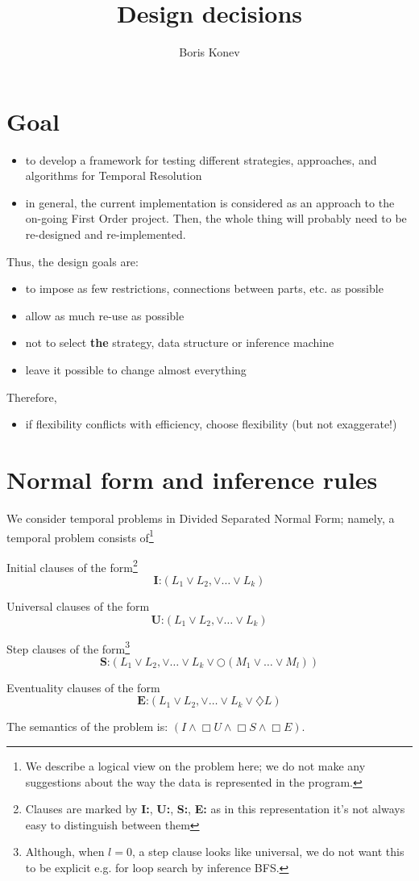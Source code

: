 \documentclass[a4paper]{article}
\newcommand*{\memph}{\textbf}
\newcommand*{\next}{\bigcirc}
\newcommand*{\always}{\Box}
\newcommand*{\sometime}{\diamondsuit}
\newcommand*{\Itag}{\textbf{I:}}
\newcommand*{\Utag}{\textbf{U:}}
\newcommand*{\Stag}{\textbf{S:}}
\newcommand*{\Etag}{\textbf{E:}}
\begin{document}
\title{Design decisions}
\author{Boris Konev}
\maketitle
\section{Goal}
\begin{itemize}
\item to develop a framework for testing different strategies, approaches,
and algorithms for Temporal Resolution
\item in general, the current implementation is considered as an approach
to the on-going First Order project. Then, the whole thing will probably 
need to be re-designed and re-implemented.
\end{itemize}
Thus, the design goals are:
\begin{itemize}
\item to impose as few restrictions, connections between parts, etc. as possible
\item allow as much re-use as possible
\item not to select \memph{the} strategy, data structure or inference machine
\item leave it possible to change almost everything
\end{itemize}
Therefore,
\begin{itemize}
\item if flexibility conflicts with efficiency, choose flexibility (but not
exaggerate!)
\end{itemize}
\section{Normal form and inference rules}
We consider temporal problems in Divided Separated Normal Form; namely, a
temporal problem consists of\footnote{We describe a logical view on the 
problem here; we do not make any suggestions about the way the data is
represented in the program.}
\begin{description}
\item{Initial clauses} of the form\footnote{Clauses are marked by \Itag{}, 
\Utag{}, \Stag{}, \Etag{} as in this representation it's not always easy to
distinguish between them}
  $$
    \Itag(L_1\lor  L_2,\lor\dots\lor L_k)
  $$
\item{Universal clauses} of the form
  $$
    \Utag(L_1\lor  L_2,\lor\dots\lor L_k)
  $$
\item{Step clauses} of the form\footnote{Although, when $l=0$, a step clause
  looks like universal, we do not want this to be explicit e.g. for
  loop search by inference BFS.}
  $$
   \Stag(L_1\lor  L_2,\lor\dots\lor L_k \lor \next (M_1\lor\dots\lor M_l))
  $$\item{Eventuality clauses} of the form
  $$
    \Etag(L_1\lor  L_2,\lor\dots\lor L_k \lor \sometime L)
  $$
\end{description}
The semantics of the problem is: $(I\land\always U\land\always S\land\always E)$.
\end{document}
